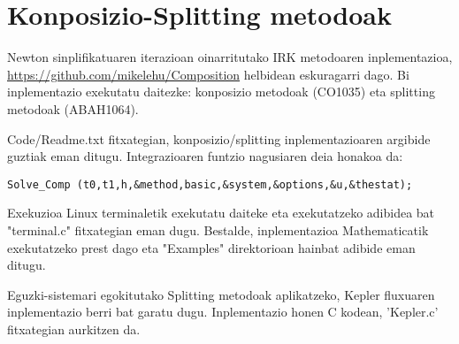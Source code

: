 \section{Konposizio-Splitting metodoak}

Newton sinplifikatuaren iterazioan oinarritutako IRK metodoaren inplementazioa, \url{https://github.com/mikelehu/Composition} helbidean eskuragarri dago. Bi inplementazio exekutatu daitezke: konposizio metodoak (CO1035) eta splitting metodoak (ABAH1064).

Code/Readme.txt fitxategian, konposizio/splitting inplementazioaren argibide guztiak eman ditugu. Integrazioaren funtzio nagusiaren deia honakoa da:   
\begin{lstlisting}
Solve_Comp (t0,t1,h,&method,basic,&system,&options,&u,&thestat);
\end{lstlisting}

Exekuzioa Linux terminaletik exekutatu daiteke eta exekutatzeko adibidea bat  "terminal.c" fitxategian eman dugu. 
Bestalde, inplementazioa Mathematicatik exekutatzeko prest dago eta "Examples" direktorioan hainbat adibide eman ditugu. 

Eguzki-sistemari egokitutako Splitting metodoak aplikatzeko, Kepler fluxuaren inplementazio berri bat garatu dugu. Inplementazio honen C kodean, 'Kepler.c' fitxategian aurkitzen da. 
